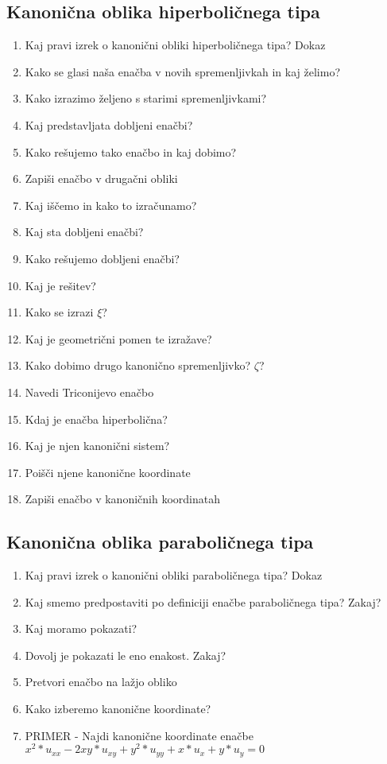 \documentclass{article}
\begin{document}
    \subsection{Kanonična oblika hiperboličnega tipa}
    \begin{enumerate}
        \item Kaj pravi izrek o kanonični obliki hiperboličnega tipa?
        Dokaz
        \item Kako se glasi naša enačba v novih spremenljivkah in kaj želimo?
        \item Kako izrazimo željeno s starimi spremenljivkami?
        \item Kaj predstavljata dobljeni enačbi?
        \item Kako rešujemo tako enačbo in kaj dobimo?
        \item Zapiši enačbo v drugačni obliki
        \item Kaj iščemo in kako to izračunamo?
        \item Kaj sta dobljeni enačbi?
        \item Kako rešujemo dobljeni enačbi?
        \item Kaj je rešitev?
        \item Kako se izrazi $\xi$?
        \item Kaj je geometrični pomen te izražave?
        \item Kako dobimo drugo kanonično spremenljivko? $\zeta$?
        \item Navedi Triconijevo enačbo
        \item Kdaj je enačba hiperbolična?
        \item Kaj je njen kanonični sistem?
        \item Poišči njene kanonične koordinate
        \item Zapiši enačbo v kanoničnih koordinatah
    \end{enumerate}

    \subsection{Kanonična oblika paraboličnega tipa}
    \begin{enumerate}
        \item Kaj pravi izrek o kanonični obliki paraboličnega tipa?
        Dokaz
        \item Kaj smemo predpostaviti po definiciji enačbe paraboličnega tipa? Zakaj?
        \item Kaj moramo pokazati?
        \item Dovolj je pokazati le eno enakost. Zakaj?
        \item Pretvori enačbo na lažjo obliko
        \item Kako izberemo kanonične koordinate?
        \item PRIMER - Najdi kanonične koordinate enačbe $x^2 * u_{xx} - 2xy * u_{xy} + y^2 * u_{yy} + x * u_x + y * u_y = 0$
    \end{enumerate}
\end{document}
